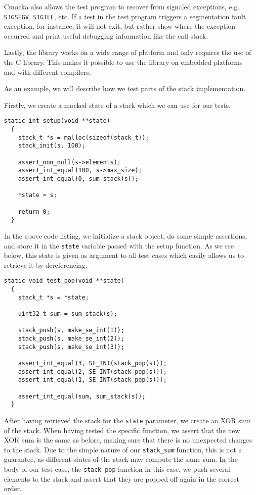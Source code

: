 Cmocka also allows the test program to recover from signaled exceptions,
e.g. {\tt SIGSEGV}, {\tt SIGILL}, etc. If a test in the test program triggers a
segmentation fault exception, for instance, it will not exit, but rather show
where the exception occurred and print useful debugging information like the
call stack.

Lastly, the library works on a wide range of platform and only requires the use
of the C library. This makes it possible to use the library on embedded
platforms and with different compilers.

As an example, we will describe how we test parts of the stack implementation.

Firstly, we create a mocked state of a stack which we can use for our tests.
\begin{lstlisting}[language={[ANSI]C},caption={Unit-test setup procedure}]
  static int setup(void **state)
  {
    stack_t *s = malloc(sizeof(stack_t));
    stack_init(s, 100);

    assert_non_null(s->elements);
    assert_int_equal(100, s->max_size);
    assert_int_equal(0, sum_stack(s));

    *state = s;

    return 0;
  }
\end{lstlisting}

In the above code listing, we initialize a stack object, do some
simple assertions, and store it in the {\tt state} variable passed
with the setup function. As we see below, this state is given as
argument to all test cases which easily allows us to retrieve it by
dereferencing.
\begin{lstlisting}[language={[ANSI]C},caption={Unit-test of {\tt stack\_pop}}]
  static void test_pop(void **state)
  {
    stack_t *s = *state;

    uint32_t sum = sum_stack(s);

    stack_push(s, make_se_int(1));
    stack_push(s, make_se_int(2));
    stack_push(s, make_se_int(3));

    assert_int_equal(3, SE_INT(stack_pop(s)));
    assert_int_equal(2, SE_INT(stack_pop(s)));
    assert_int_equal(1, SE_INT(stack_pop(s)));

    assert_int_equal(sum, sum_stack(s));
  }
\end{lstlisting}

After having retrieved the stack for the {\tt state} parameter, we create an XOR
sum of the stack. When having tested the specific function, we assert that the
new XOR sum is the same as before, making sure that there is no unexpected
changes to the stack. Due to the simple nature of our {\tt stack\_sum} function,
this is not a guarantee, as different states of the stack may compute the same
sum. %
In the body of our test case, the {\tt stack\_pop} function in this case, we
push several elements to the stack and assert that they are popped off again in
the correct order.

